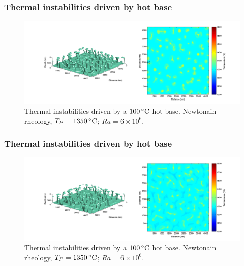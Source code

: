 \documentclass[aspectratio=169]{beamer}
\begin{document}
\begin{frame}
    \frametitle{Thermal instabilities driven by hot base}
    \begin{figure}
        \vspace{-.5cm}
        \includegraphics[width=0.85\paperwidth]{./figures/Newt100/dT1.0741_4x4_Newt_Ra6e6_4.png}
        \caption{Thermal instabilities driven by a $100\rm\,^{\circ}C$ hot base. Newtonain rheology, $T_{P}=1350\rm\,^{\circ}C$; $Ra = 6\times10^{6}$.}
    \end{figure}
\end{frame}

\begin{frame}
    \frametitle{Thermal instabilities driven by hot base}
    \begin{figure}
        \vspace{-.5cm}
        \includegraphics[width=0.85\paperwidth]{./figures/Newt100/dT1.0741_4x4_Newt_Ra6e6_5.png}
        \caption{Thermal instabilities driven by a $100\rm\,^{\circ}C$ hot base. Newtonain rheology, $T_{P}=1350\rm\,^{\circ}C$; $Ra = 6\times10^{6}$.}
    \end{figure}
\end{frame}
\end{document}
